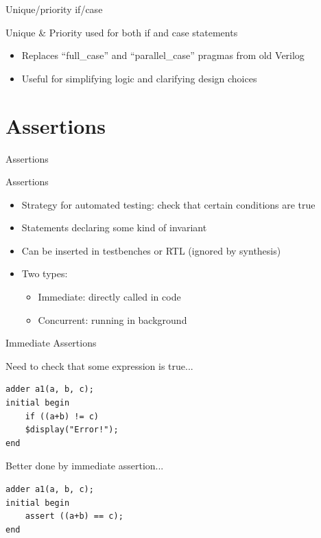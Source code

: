 \documentclass[table,dvipsnames]{beamer}
\begin{document}
   \begin{frame}{Unique/priority if/case}
	\begin{block}{Unique \& Priority used for both if and case statements}
		\begin{itemize}
			\item Replaces ``full\_case'' and ``parallel\_case'' pragmas from old Verilog
			\item Useful for simplifying logic and clarifying design choices
		\end{itemize}
	\end{block}
\end{frame}

 \section{Assertions}
   \begin{frame}{Assertions}
	\begin{block}{Assertions}
		\begin{itemize}
			\item Strategy for automated testing: check that certain conditions are true
			\item Statements declaring some kind of invariant
			\item Can be inserted in testbenches or RTL (ignored by synthesis)
			\item Two types:
			\begin{itemize}
				\item Immediate: directly called in code
				\item Concurrent: running in background
			\end{itemize}
		\end{itemize}
	\end{block}
\end{frame}

\begin{frame}[fragile]{Immediate Assertions}
	\begin{block}{Need to check that some expression is true...}
			\begin{verbatim}
adder a1(a, b, c);
initial begin
	if ((a+b) != c)
	$display("Error!");
end
		\end{verbatim}
	\end{block}
	\begin{block}{Better done by immediate assertion...}
		\begin{verbatim}
adder a1(a, b, c);
initial begin
	assert ((a+b) == c);	
end
		\end{verbatim}
	\end{block}
\end{frame}
\end{document}
